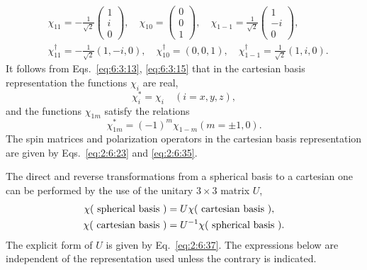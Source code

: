 \begin{align}
& \chi_{11}=-\frac{1}{\sqrt{2}}\begin{pmatrix}
1 \\
i \\
0
\end{pmatrix}, \quad \chi_{10}=\begin{pmatrix}
0 \\
0 \\
1
\end{pmatrix}, \quad \chi_{1-1}=\frac{1}{\sqrt{2}}\begin{pmatrix}
1 \\
-i \\
0
\end{pmatrix}, \label{eq:6:3:15}\\
& \chi_{11}^{\dagger}=-\frac{1}{\sqrt{2}}(1,-i, 0), \quad \chi_{10}^{\dagger}=(0,0,1), \quad \chi_{1-1}^{\dagger}=\frac{1}{\sqrt{2}}(1, i, 0) . \label{eq:6:3:16}
\end{align}
It follows from Eqs.~\eqref{eq:6:3:13}, \eqref{eq:6:3:15} that in the cartesian basis representation the functions $\chi_{i}$ are real,
\begin{equation}
\chi_{i}^{*}=\chi_{i} \quad(i=x, y, z), \label{eq:6:3:17}
\end{equation}
and the functions $\chi_{1 m}$ satisfy the relations
\begin{equation}
\chi_{1 m}^{*}=(-1)^{m} \chi_{1-m}(m= \pm 1,0) . \label{eq:6:3:18}
\end{equation}
The spin matrices and polarization operators in the cartesian basis representation are given by Eqs.~\eqref{eq:2:6:23} and \eqref{eq:2:6:35}.

The direct and reverse transformations from a spherical basis to a cartesian one can be performed by the use of the unitary $3 \times 3$ matrix $U$,
\begin{align}
\chi(\text { spherical basis }) & =U \chi(\text { cartesian basis })  , \notag\\
\chi(\text { cartesian basis }) & =U^{-1} \chi(\text { spherical basis }) . \label{eq:6:3:19}
\end{align}
The explicit form of $U$ is given by Eq.~\eqref{eq:2:6:37}. The expressions below are independent of the representation used unless the contrary is indicated.

